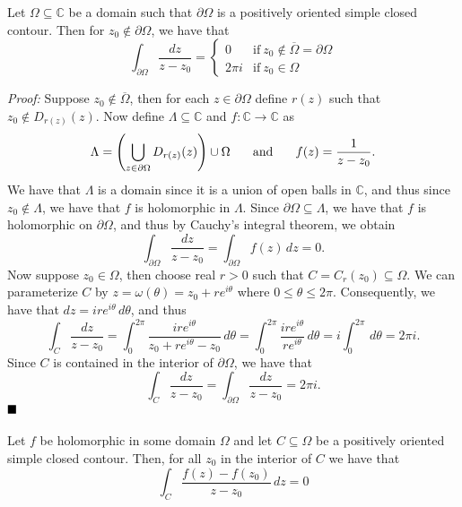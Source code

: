 \documentclass[12pt]{article}
\newcommand{\C}{\mathbb{C}}
\newcommand{\parenb}[1]{\left(#1\right)}
\newcommand{\proof}{\textit{Proof: }}
\newcommand{\done}{\ensuremath{\strut\hfill\blacksquare}}
\begin{document}
\pagestyle{fancy}
\fancyhead[C]{}

\setlength{\parindent}{0in}
\setlength{\parskip}{0.1in}

\setcounter{section}{8}

\begin{lemma}{}{}
	Let \( \Omega \subseteq \C \) be a domain such that \( \partial\Omega \) is
	a positively oriented simple closed contour.
	Then for \( z_0 \notin \partial\Omega \), we have that
	\[
		\int_{\partial\Omega} \frac{dz}{z - z_0}
		= \begin{cases}
			0 & \text{if} \ z_0 \notin \overline{\Omega}
			= \partial\Omega \\
			2\pi i & \text{if} \ z_0 \in \Omega
		\end{cases}
	\]
\end{lemma}

\proof
Suppose \( z_0 \notin \overline{\Omega} \), then for each
\( z \in \partial\Omega \) define \( r(z) \) such that
\( z_0 \notin D_{r(z)}(z) \).
Now define \( \Lambda \subseteq \C \) and \( f : \C \to \C \) as
\[
	\Lambda = \parenb{\bigcup_{z \in \partial\Omega} D_{r(z)}(z) } \cup \Omega
	\hspace{0.25in} \text{and} \hspace{0.25in}
	f(z) = \frac{1}{z - z_0}.
\]
We have that \( \Lambda \) is a domain since it is a union of open balls in
\( \C \), and thus since \( z_0 \notin \Lambda \), we have that \( f \) is
holomorphic in \( \Lambda \).
Since \( \partial\Omega \subseteq \Lambda \), we have that \( f \) is
holomorphic on \( \partial\Omega \), and thus by Cauchy's integral theorem, we
obtain
\[
	\int_{\partial\Omega} \frac{dz}{z - z_0}
	= \int_{\partial\Omega} f(z) \, dz
	= 0.
\]
Now suppose \( z_0 \in \Omega \), then choose real \( r > 0 \) such that
\( C = C_{r}(z_0) \subseteq \Omega \).
We can parameterize \( C \) by \( z = \omega(\theta) = z_0 + re^{i\theta} \)
where \( 0 \leq \theta \leq 2\pi \).
Consequently, we have that \( dz = ire^{i\theta} \, d\theta \), and thus
\[
	\int_C \frac{dz}{z - z_0}
	= \int_0^{2\pi} \frac{ire^{i\theta}}{z_0 + re^{i\theta} - z_0} \, d\theta
	= \int_0^{2\pi} \frac{ire^{i\theta}}{re^{i\theta}} \, d\theta
	= i \int_0^{2\pi} \, d\theta
	= 2\pi i.
\]
Since \( C \) is contained in the interior of \( \partial\Omega \), we have
that
\[
	\int_C \frac{dz}{z - z_0}
	= \int_{\partial\Omega} \frac{dz}{z - z_0}
	= 2\pi i.
\]
\done

\pagebreak
\begin{lemma}{}{}
	Let \( f \) be holomorphic in some domain \( \Omega \) and let
	\( C \subseteq \Omega \) be a positively oriented simple closed contour.
	Then, for all \( z_0 \) in the interior of \( C \) we have that
	\[
		\int_C \frac{f(z) - f(z_0)}{z - z_0} \, dz = 0
	\]
\end{lemma}
\end{document}
